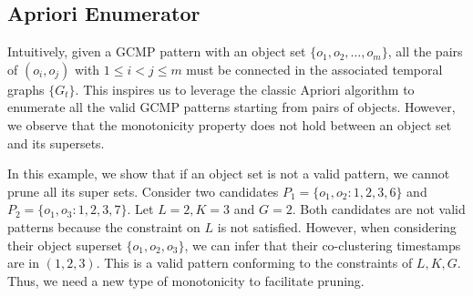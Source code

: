 %
%

\subsection{Apriori Enumerator}
Intuitively, given a GCMP pattern with an object set $\{o_1,o_2,\ldots,o_m\}$, 
all the pairs of $(o_i,o_j)$ with $1\leq i<j\leq m$ must 
be connected in the associated temporal graphs $\{G_t\}$. This inspires us to leverage the classic Apriori algorithm to enumerate all the valid GCMP patterns starting from pairs of objects. However, we observe that the monotonicity property does not hold between an object set and its supersets.

\begin{example}
In this example, we show that if an object set is not a valid pattern, we cannot prune all its super sets.
Consider two candidates $P_1=\{o_1,o_2:1,2,3,6\}$ and $P_2=\{o_1,o_3:1,2,3,7\}$. 
Let $L=2,K=3$ and $G=2$. Both candidates are not valid patterns because the constraint on $L$ is not satisfied. 
However, when considering their object superset $\{o_1,o_2,o_3\}$, we can infer that their co-clustering timestamps are in $(1,2,3)$. This is a valid pattern conforming to the constraints of $L,K,G$. Thus, we need a new type of monotonicity to facilitate pruning.
\end{example}   


